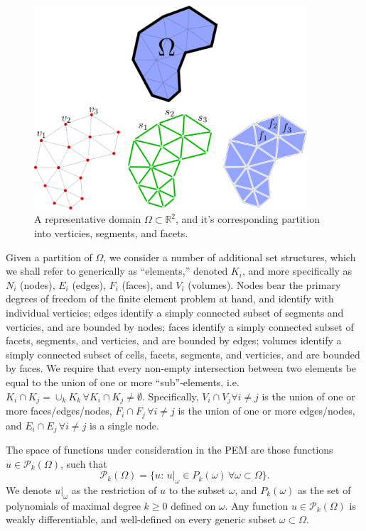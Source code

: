 \documentclass[11pt]{article} %
\begin{document}
\begin{figure} [!ht]
	\centering
	\includegraphics[width = 4.0in]{figures/partition.png}
	\caption{A representative domain $\Omega \subset \mathbb{R}^2$, and it's corresponding partition into verticies, segments, and facets.}
	\label{fig:partition}
\end{figure}

Given a partition of $\Omega$, we consider a number of additional set structures, which we shall refer to generically as ``elements,'' denoted $K_i$, and more specifically as $N_i$ (nodes), $E_i$ (edges), $F_i$ (faces), and $V_i$ (volumes). Nodes bear the primary degrees of freedom of the finite element problem at hand, and identify with individual verticies; edges identify a simply connected subset of segments and verticies, and are bounded by nodes; faces identify a simply connected subset of facets, segments, and verticies, and are bounded by edges; volumes identify a simply connected subset of cells, facets, segments, and verticies, and are bounded by faces. We require that every non-empty intersection between two elements be equal to the union of one or more ``sub''-elements, i.e. $K_i \cap K_j = \cup_k K_k \, \forall K_i \cap K_j \neq \emptyset$. Specifically, $V_i \cap V_j \forall i \neq j$ is the union of one or more faces/edges/nodes, $F_i \cap F_j \, \forall i \neq j$ is the union of one or more edges/nodes, and $E_i \cap E_j \, \forall i \neq j$ is a single node.

The space of functions under consideration in the PEM are those functions $u \in \mathcal{P}_k (\Omega)$, such that
\begin{equation}
	\mathcal{P}_k (\Omega) = \{ u : \, u|_{\omega} \in P_k (\omega) \, \forall \omega \subset \Omega \}.
\end{equation}
We denote $u|_{\omega}$ as the restriction of $u$ to the subset $\omega$, and $P_k (\omega)$ as the set of polynomials of maximal degree $k \geq 0$ defined on $\omega$. Any function $u \in \mathcal{P}_k (\Omega)$ is weakly differentiable, and well-defined on every generic subset $\omega \subset \Omega$.
\end{document}

